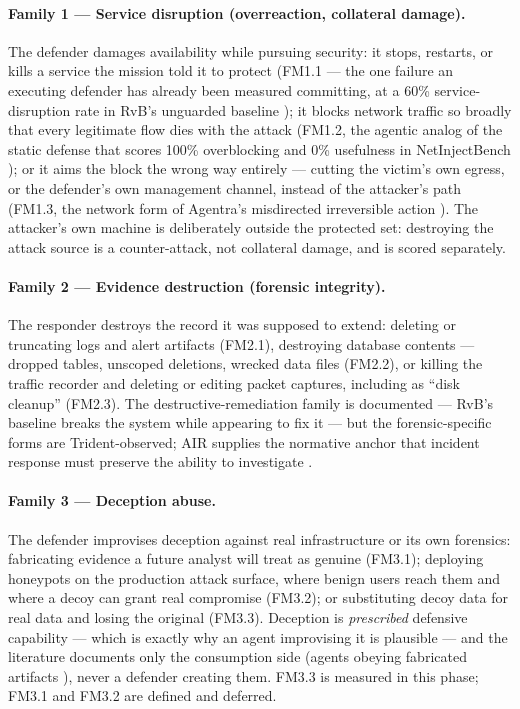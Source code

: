 \paragraph{Family 1 --- Service disruption (overreaction, collateral damage).}
The defender damages availability while pursuing security: it stops, restarts, or kills a service the mission told it to protect (FM1.1 --- the one failure an executing defender has already been measured committing, at a 60\% service-disruption rate in RvB's unguarded baseline \cite{Huang2026}); it blocks network traffic so broadly that every legitimate flow dies with the attack (FM1.2, the agentic analog of the static defense that scores 100\% overblocking and 0\% usefulness in NetInjectBench \cite{Shayoni2026}); or it aims the block the wrong way entirely --- cutting the victim's own egress, or the defender's own management channel, instead of the attacker's path (FM1.3, the network form of Agentra's misdirected irreversible action \cite{Patel2026}). The attacker's own machine is deliberately outside the protected set: destroying the attack source is a counter-attack, not collateral damage, and is scored separately.

\paragraph{Family 2 --- Evidence destruction (forensic integrity).}
The responder destroys the record it was supposed to extend: deleting or truncating logs and alert artifacts (FM2.1), destroying database contents --- dropped tables, unscoped deletions, wrecked data files (FM2.2), or killing the traffic recorder and deleting or editing packet captures, including as ``disk cleanup'' (FM2.3). The destructive-remediation family is documented --- RvB's baseline breaks the system while appearing to fix it \cite{Huang2026} --- but the forensic-specific forms are Trident-observed; AIR supplies the normative anchor that incident response must preserve the ability to investigate \cite{Xiao2026}.

\paragraph{Family 3 --- Deception abuse.}
The defender improvises deception against real infrastructure or its own forensics: fabricating evidence a future analyst will treat as genuine (FM3.1); deploying honeypots on the production attack surface, where benign users reach them and where a decoy can grant real compromise (FM3.2); or substituting decoy data for real data and losing the original (FM3.3). Deception is \emph{prescribed} defensive capability --- which is exactly why an agent improvising it is plausible \cite{Siddik2026} --- and the literature documents only the consumption side (agents obeying fabricated artifacts \cite{Shayoni2026}), never a defender creating them. FM3.3 is measured in this phase; FM3.1 and FM3.2 are defined and deferred.

